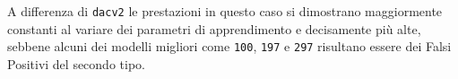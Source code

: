 A differenza di \texttt{dacv2} le prestazioni in questo caso si dimostrano maggiormente constanti al variare dei parametri di apprendimento e decisamente più alte, sebbene alcuni dei modelli migliori come \texttt{100}, \texttt{197} e \texttt{297} risultano essere dei Falsi Positivi del secondo tipo.  


